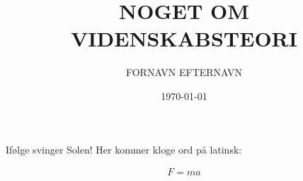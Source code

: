 \documentclass[a4paper, oneside, 11pt, article, danish]{memoir}
\author{FORNAVN EFTERNAVN}
\title{NOGET OM VIDENSKABSTEORI}
\date{\today}
\begin{document}
\maketitle


\noindent Ifølge \textcite{asteroseismology} svinger Solen! Her kommer kloge ord
på latinsk:

\lipsum[30]

\begin{align}
  F = m a
\end{align}

\raggedyright[4em] \printbibliography[heading=memoirbib]
\end{document}
